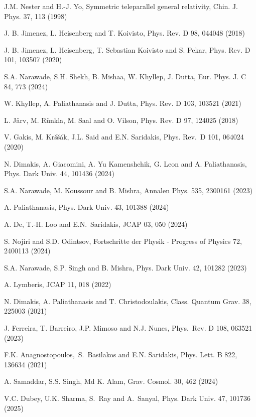 \documentclass[onecolumn,superscriptaddress,secnumarabic,nobibnotes,aps,prd,nofootinbib,altaffilletter,11pt]{revtex4}
\begin{document}
\begin{thebibliography}{99}
 J.M. Nester and H.-J. Yo, Symmetric teleparallel
general relativity, Chin. J. Phys. 37, 113 (1998)

 J. B. Jimenez, L. Heisenberg and T. Koivisto, Phys. Rev. D 98,
044048 (2018)

 J. B. Jimenez, L. Heisenberg, T. Sebastian Koivisto and S.
Pekar, Phys. Rev. D 101, 103507 (2020)

 S.A. Narawade, S.H. Shekh, B. Mishaa, W. Khyllep, J. Dutta,
Eur. Phys. J. C 84, 773 (2024)

 W. Khyllep, A. Paliathanasis and J. Dutta, Phys. Rev. D 103,
103521 (2021)

 L. J\"{a}rv, M. R\"{u}nkla, M. Saal and O. Vilson, Phys. Rev.
D 97, 124025 (2018)

 V. Gakis, M. Kr\v{s}\v{s}\'{a}k, J.L. Said and E.N. Saridakis,
Phys. Rev.\ D 101, 064024 (2020)

 N. Dimakis, A. Giacomini, A. Yu Kamenshchik, G. Leon and A.
Paliathanasis, Phys. Dark Univ. 44, 101436 (2024)

 S.A. Narawade, M. Koussour and B. Mishra, Annalen Phys. 535,
2300161 (2023)

 A. Paliathanasis, Phys. Dark Univ. 43, 101388 (2024)

 A. De, T.-H. Loo and E.N.\ Saridakis, JCAP 03, 050 (2024)

 S. Nojiri and S.D. Odintsov, Fortschritte der Physik -
Progress of Physics 72, 2400113 (2024)

 S.A. Narawade, S.P. Singh and B. Mishra, Phys. Dark Univ. 42,
101282 (2023)

 A. Lymberis, JCAP 11, 018 (2022)

 N. Dimakis, A. Paliathanasis and T. Christodoulakis, Class.
Quantum Grav. 38, 225003 (2021)

 J. Ferreira, T. Barreiro, J.P. Mimoso and N.J. Nunes, Phys.\
Rev. D 108, 063521 (2023)

 F.K. Anagnostopoulos,\ S.\ Basilakos and E.N. Saridakis, Phys.
Lett. B 822, 136634 (2021)

 A. Samaddar, S.S. Singh, Md K. Alam, Grav. Cosmol. 30, 462
(2024)

 V.C. Dubey, U.K. Sharma, S.\ Ray and A.\ Sanyal, Phys. Dark
Univ. 47, 101736 (2025)


\end{thebibliography}
\end{document}
